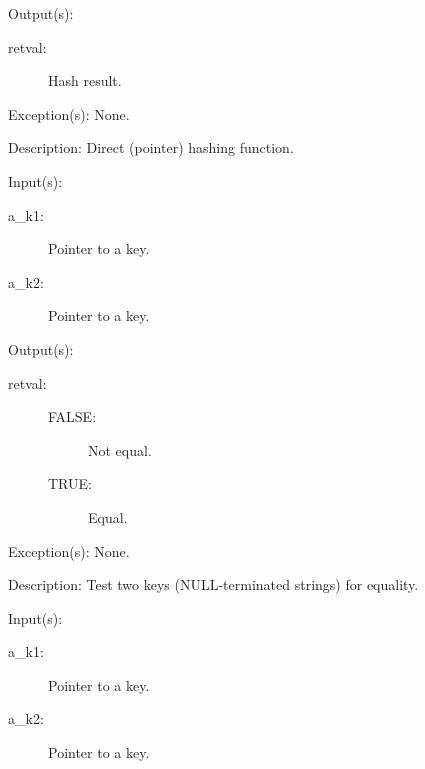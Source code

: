 \begin{capi}
\begin{capilist}
	\item[Output(s): ]
		\begin{description}\item[]
		\item[retval: ]
			Hash result.
		\end{description}
	\item[Exception(s): ] None.
	\item[Description: ]
		Direct (pointer) hashing function.
	\end{capilist}
\label{ch_string_key_comp}
	\begin{capilist}
	\item[Input(s): ]
		\begin{description}\item[]
		\item[a\_k1: ]
			Pointer to a key.
		\item[a\_k2: ]
			Pointer to a key.
		\end{description}
	\item[Output(s): ]
		\begin{description}\item[]
		\item[retval: ]
			\begin{description}\item[]
			\item[FALSE: ]
				Not equal.
			\item[TRUE: ]
				Equal.
			\end{description}
		\end{description}
	\item[Exception(s): ] None.
	\item[Description: ]
		Test two keys (NULL-terminated strings) for equality.
	\end{capilist}
\label{ch_direct_key_comp}
	\begin{capilist}
	\item[Input(s): ]
		\begin{description}\item[]
		\item[a\_k1: ]
			Pointer to a key.
		\item[a\_k2: ]
			Pointer to a key.
		\end{description}

\end{capilist}
\end{capi}
